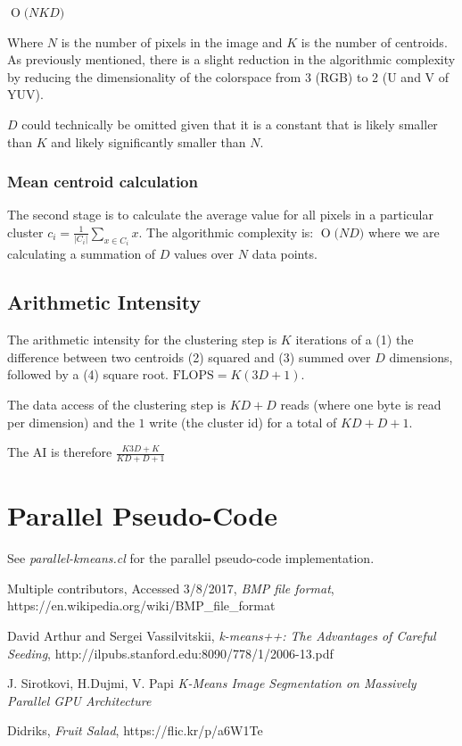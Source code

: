 \documentclass[11pt]{article}
\newcommand{\BigO}[1]{\ensuremath{\operatorname{O}\bigl(#1\bigr)}}
\begin{document}
$\BigO{NKD}$

Where $N$ is the number of pixels in the image and $K$ is the number of centroids. As
previously mentioned, there is a slight reduction in the algorithmic complexity by
reducing the dimensionality of the colorspace from 3 (RGB) to 2 (U and V of YUV).

$D$ could technically be omitted given that it is a constant that is likely smaller
than $K$ and likely significantly smaller than $N$.

\subsubsection{Mean centroid calculation}

The second stage is to calculate the average value for all pixels in a particular cluster $c_i = \frac{1}{|C_i|}\sum_{x \in C_i}x$. The algorithmic complexity is: $\BigO{ND}$ where we are calculating a summation of $D$ values over $N$ data points.

\subsection{Arithmetic Intensity}

The arithmetic intensity for the clustering step is $K$ iterations of a (1) the difference between two centroids (2) squared and (3) summed over $D$ dimensions, followed by a (4) square root. $\text{FLOPS} = K(3D+1)$.

The data access of the clustering step is $KD+D$ reads (where one byte is read per dimension) and the $1$ write (the cluster id) for a total of $KD+D+1$.

The AI is therefore $\frac{K3D+K}{KD+D+1}$

\section{Parallel Pseudo-Code}

See \emph{parallel-kmeans.cl} for the parallel pseudo-code implementation.

\begin{thebibliography}{9}

  Multiple contributors,
  Accessed 3/8/2017,
  \emph{BMP file format},
  https://en.wikipedia.org/wiki/BMP_file_format

  David Arthur and Sergei Vassilvitskii,
  \emph{k-means++: The Advantages of Careful Seeding},
  http://ilpubs.stanford.edu:8090/778/1/2006-13.pdf

  J. Sirotkovi, H.Dujmi, V. Papi
  \emph{K-Means Image Segmentation on Massively Parallel GPU Architecture}

  Didriks,
  \emph{Fruit Salad},
  https://flic.kr/p/a6W1Te

\end{thebibliography}
\end{document}
